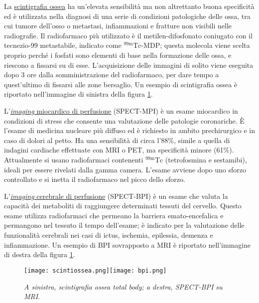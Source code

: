 \documentclass{report}
\newcommand{\figref}[1]{figura \ref{#1}}
\numberwithin{equation}{section}
\numberwithin{figure}{section}
\begin{document}
La \underline{scintigrafia ossea} ha un’elevata sensibilità ma non altrettanto buona specificità ed è utilizzata nella diagnosi di una serie di condizioni patologiche delle ossa, tra cui tumore dell'osso o metastasi, infiammazioni e fratture non visibili nelle radiografie. Il radiofarmaco più utilizzato è il metilen-difosfonato coniugato con il tecnezio-99 metastabile, indicato come $\mathrm{^{99m}Tc}$-MDP; questa molecola viene scelta proprio perché i fosfati sono elementi di base nella formazione delle ossa, e riescono a fissarsi su di esse. L'acquisizione delle immagini di solito viene eseguita dopo 3 ore dalla somministrazione del radiofarmaco, per dare tempo a quest'ultimo di fissarsi alle zone bersaglio. Un esempio di scintigrafia ossea è riportato nell'immagine di sinistra della \figref{fig:scintiossea}.

L'\underline{\textit{imaging} miocardico di perfusione} (SPECT-MPI) è un esame miocardico in condizioni di stress che consente una valutazione delle patologie coronariche. È l’esame di medicina nucleare più diffuso ed è richiesto in ambito prechirurgico e in caso di dolori al petto. Ha una sensibilità di circa l'88\%, simile a quella di indagini cardiache effettuate con MRI o PET, ma specificità minore (61\%). Attualmente si usano radiofarmaci contenenti $\mathrm{^{99m}Tc}$ (tetrofosmina e sestamibi), ideali per essere rivelati dalla gamma camera. L’esame avviene dopo uno sforzo controllato e si inetta il radiofarmaco nel picco dello sforzo.

L'\underline{\textit{imaging} cerebrale di perfusione} (SPECT-BPI) è un esame che valuta la capacità dei metaboliti di raggiungere determinati tessuti del cervello. Questo esame utilizza radiofarmaci che permeano la barriera emato-encefalica e permangono nel tessuto il tempo dell'esame; è indicato per la valutazione delle funzionalità cerebrali nei casi di ictus, ischemia, epilessia, demenza e infiammazione. Un esempio di BPI sovrapposto a MRI è riportato nell'immagine di destra della \figref{fig:scintiossea}.

\begin{figure}[htp]
    \centering
    \texttt{[image: scintiossea.png]}\quad\texttt{[image: bpi.png]}
    \caption{\label{fig:scintiossea} \textit{A sinistra, scintigrafia ossea total body; a destra, SPECT-BPI su MRI}.}
\end{figure}
\end{document}

